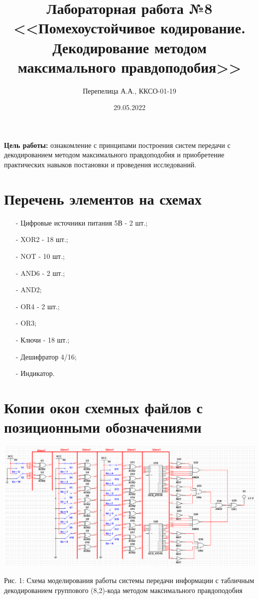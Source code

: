 \documentclass[14pt]{article}
\title{\textbf{Лабораторная работа №8\\
<<Помехоустойчивое кодирование. Декодирование методом максимального правдоподобия>>}}
\author{Перепелица А.А., ККСО-01-19}
\date{29.05.2022}
\begin{document}
\maketitle
\thispagestyle{empty}
\textbf{Цель работы:} ознакомление с принципами построения систем передачи с декодированием методом максимального правдоподобия и приобретение практических навыков постановки и проведения исследований.\\
\section{Перечень элементов на схемах}
\begin{itemize}
    \item[-] Цифровые источники питания 5В - 2 шт.; 
    \item[-] XOR2 - 18 шт.;
    \item[-] NOT - 10 шт.;
    \item[-] AND6 - 2 шт.;
    \item[-] AND2;
    \item[-] OR4 - 2 шт.;
    \item[-] OR3;
    \item[-] Ключи - 18 шт.; 
    \item[-] Дешифратор 4/16; 
    \item[-] Индикатор.
\end{itemize}
\section{Копии окон схемных файлов с позиционными обозначениями}
\includegraphics[width=1\linewidth]{scheme.png}
\begin{center}
    Рис. 1: Схема моделирования работы системы передачи информации с табличным декодированием группового (8,2)-кода методом максимального правдоподобия\\
\end{center}
\end{document}
